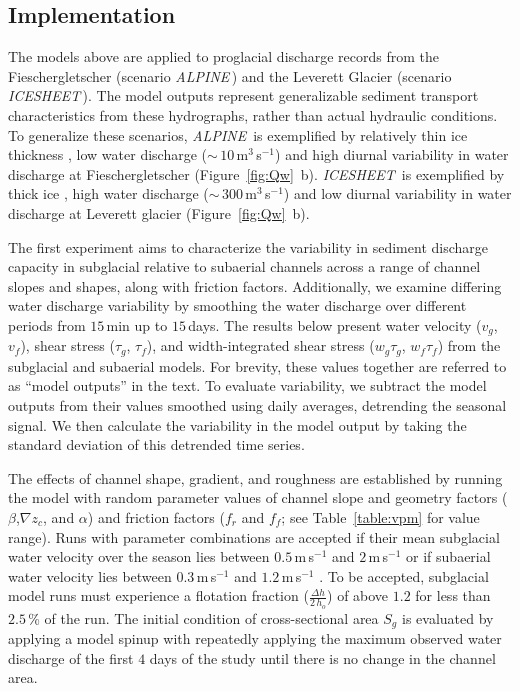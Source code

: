 \documentclass[esurf, manuscript]{copernicus}
\newcommand{\alpine}{\textit{ALPINE}\,}
\newcommand{\icesheet}{\textit{ICESHEET}\,}
\begin{document}
\FloatBarrier
\subsection{Implementation}
\label{sect:imp}

The models above are applied to proglacial discharge records from the Fieschergletscher (scenario \alpine{}) and the Leverett Glacier (scenario \icesheet{}).
The model outputs represent generalizable sediment transport characteristics from these hydrographs, rather than actual hydraulic conditions.
To generalize these scenarios, \alpine{}  is exemplified by relatively thin ice thickness \citep[$h_{ice}$= $225$\,\unit{m}][]{grab2021}, low water discharge ($\sim\,10$\,\unit{m}$^3$\,\unit{s}$^{-1}$) and high diurnal variability in water discharge at Fieschergletscher (Figure~\ref{fig:Qw}\, b).
\icesheet{}  is exemplified by thick ice  \citep[$h_{ice}$= $700$\,\unit{m}; ][]{morlighem2017}, high water discharge ($\sim\,300$\,\unit{m}$^3$\,\unit{s}$^{-1}$)  and low diurnal variability in water discharge at Leverett glacier (Figure~\ref{fig:Qw}\, b).

The first experiment aims to characterize the variability in sediment discharge capacity in subglacial relative to subaerial channels across a range of channel slopes and shapes, along with friction factors.
Additionally, we examine differing water discharge variability by smoothing the water discharge over different periods from $15$\,\unit{min} up to $15$\,\unit{days}.
The results below present water velocity ($v_g$, $v_f$), shear stress ($\tau_g$, $\tau_f$), and width-integrated shear stress ($w_g\tau_g$, $w_f\tau_f$) from the subglacial and subaerial models.
For brevity, these values together are referred to as ``model outputs'' in the text.
To evaluate variability, we subtract the model outputs from their values smoothed using daily averages,  detrending the seasonal signal.
We then calculate the variability in the model output by taking the standard deviation of this detrended time series.

The effects of channel shape, gradient, and roughness are established by running the model with random parameter values of channel slope and geometry factors ($\beta$,$\nabla z_c$, and $\alpha$) and friction factors ($f_r$ and $f_f$; see Table~\ref{table:vpm} for value range).
Runs with parameter combinations are accepted if their mean subglacial water velocity over the season lies between $0.5$\,\unit{m}\,\unit{s}$^{-1}$ and $2$\,\unit{m}\,\unit{s}$^{-1}$ or if subaerial water velocity lies between $0.3$\,\unit{m}\,\unit{s}$^{-1}$ and $1.2$\,\unit{m}\,\unit{s}$^{-1}$ \citep[e.g.][]{werder2010b,magnusson2012,chandler2013}.
To be accepted, subglacial model runs must experience a flotation fraction ($\frac{\Delta h}{2\,h_o}$) of above $1.2$ for less than $2.5$\,\% of the run.
The initial condition of cross-sectional area $S_g$ is evaluated by applying a model spinup with repeatedly applying the maximum observed water discharge of the first $4$ days of the study until there is no change in the channel area. 
\end{document}
